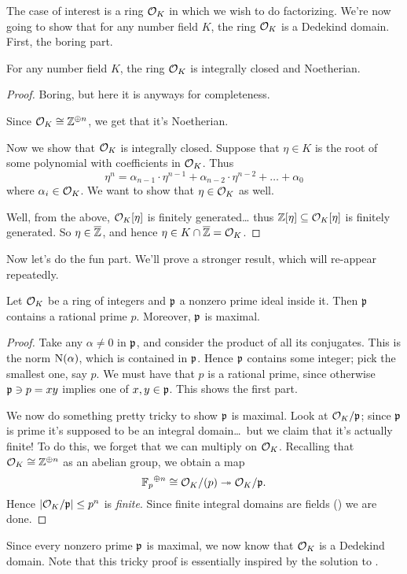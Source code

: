The case of interest is a ring $\mathcal O_K$ in which we wish to do factorizing.
We're now going to show that for any number field $K$, the ring $\mathcal O_K$ is a Dedekind domain.
First, the boring part.
\begin{proposition}
	For any number field $K$, the ring $\mathcal O_K$ is integrally closed and Noetherian.
\end{proposition}
\begin{proof}
	Boring, but here it is anyways for completeness.

	Since $\mathcal O_K \cong \mathbb Z^{\oplus n}$, we get that it's Noetherian.

	Now we show that $\mathcal O_K$ is integrally closed.
	Suppose that $\eta \in K$ is the root of some polynomial with coefficients in $\mathcal O_K$.
	Thus
	\[ \eta^n = \alpha_{n-1} \cdot \eta^{n-1} + \alpha_{n-2} \cdot \eta^{n-2}
		+ \dots + \alpha_0 \] 
	where $\alpha_i \in \mathcal O_K$. We want to show that $\eta \in \mathcal O_K$ as well.

	Well, from the above, $\mathcal O_K[\eta]$ is finitely generated\dots
	thus $\mathbb Z[\eta] \subseteq \mathcal O_K[\eta]$ is finitely generated.
	So $\eta \in \overline{\mathbb Z}$, and hence $\eta \in K \cap \overline{\mathbb Z} = \mathcal O_K$.
\end{proof}
Now let's do the fun part.
We'll prove a stronger result, which will re-appear repeatedly.
\begin{theorem}
	Let $\mathcal O_K$ be a ring of integers and $\mathfrak p$ a nonzero prime ideal inside it.
	Then $\mathfrak p$ contains a rational prime $p$. Moreover, $\mathfrak p$ is maximal.
\end{theorem}
\begin{proof}
	Take any $\alpha \neq 0$ in $\mathfrak p$, and consider the product of all its conjugates.
	This is the norm $\operatorname{N}(\alpha)$, which is contained in $\mathfrak p$.
	Hence $\mathfrak p$ contains some integer; pick the smallest one, say $p$.
	We must have that $p$ is a rational prime, since otherwise $\mathfrak p \ni p = xy$
	implies one of $x,y \in \mathfrak p$.
	This shows the first part.

	We now do something pretty tricky to show $\mathfrak p$ is maximal.
	Look at $\mathcal O_K / \mathfrak p$;
	since $\mathfrak p$ is prime it's supposed to be an integral domain\dots\ 
	but we claim that it's actually finite!
	To do this, we forget that we can multiply on $\mathcal O_K$.
	Recalling that $\mathcal O_K \cong \mathbb Z^{\oplus n}$ as an abelian group,
	we obtain a map
	\[ {\mathbb F_p}^{\oplus n} \cong \mathcal O_K / (p) \twoheadrightarrow \mathcal O_K / \mathfrak p. \]
	Hence $\left\lvert \mathcal O_K / \mathfrak p \right\rvert \le p^n$ is \emph{finite}.
	Since finite integral domains are fields ()
	we are done.
\end{proof}
Since every nonzero prime $\mathfrak p$ is maximal, we now know that $\mathcal O_K$ is a Dedekind domain.
Note that this tricky proof is essentially inspired by the solution to .

